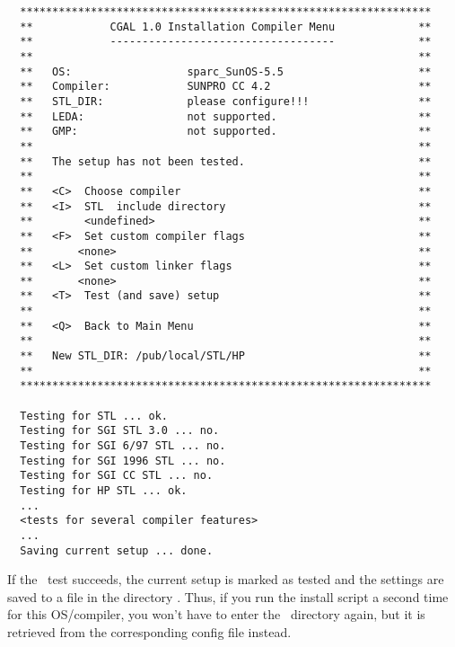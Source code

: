 \begin{scriptsize}
\begin{verbatim}
  ****************************************************************
  **            CGAL 1.0 Installation Compiler Menu             **
  **            -----------------------------------             **
  **                                                            **
  **   OS:                  sparc_SunOS-5.5                     **
  **   Compiler:            SUNPRO CC 4.2                       **
  **   STL_DIR:             please configure!!!                 **
  **   LEDA:                not supported.                      **
  **   GMP:                 not supported.                      **
  **                                                            **
  **   The setup has not been tested.                           **
  **                                                            **
  **   <C>  Choose compiler                                     **
  **   <I>  STL  include directory                              **
  **        <undefined>                                         **
  **   <F>  Set custom compiler flags                           **
  **       <none>                                               **
  **   <L>  Set custom linker flags                             **
  **       <none>                                               **
  **   <T>  Test (and save) setup                               **
  **                                                            **
  **   <Q>  Back to Main Menu                                   **
  **                                                            **
  **   New STL_DIR: /pub/local/STL/HP                           **
  **                                                            **
  ****************************************************************

  Testing for STL ... ok.
  Testing for SGI STL 3.0 ... no.
  Testing for SGI 6/97 STL ... no.
  Testing for SGI 1996 STL ... no.
  Testing for SGI CC STL ... no.
  Testing for HP STL ... ok.
  ...
  <tests for several compiler features>
  ...
  Saving current setup ... done.
\end{verbatim}
\end{scriptsize}

If the \stl\ test succeeds, the current setup is marked as tested and
the settings are saved to a file in the directory \cgalinstconfdir.
Thus, if you run the install script a second time for this
OS/compiler, you won't have to enter the \stl\ directory again, but it
is retrieved from the corresponding config file instead.

